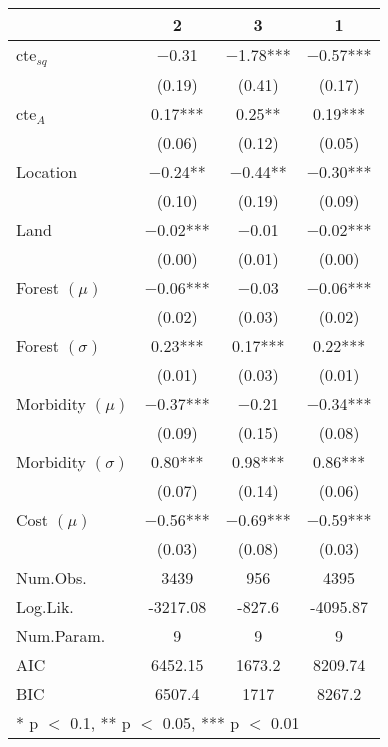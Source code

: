 \begin{table}
\centering
\begin{tabular}[t]{lccc}
\toprule
  & 2 & 3 & 1\\
\midrule
cte$_{sq}$ & \num{-0.31} & \num{-1.78}*** & \num{-0.57}***\\
 & (\num{0.19}) & (\num{0.41}) & (\num{0.17})\\
cte$_{A}$ & \num{0.17}*** & \num{0.25}** & \num{0.19}***\\
 & (\num{0.06}) & (\num{0.12}) & (\num{0.05})\\
Location & \num{-0.24}** & \num{-0.44}** & \num{-0.30}***\\
 & (\num{0.10}) & (\num{0.19}) & (\num{0.09})\\
Land & \num{-0.02}*** & \num{-0.01} & \num{-0.02}***\\
 & (\num{0.00}) & (\num{0.01}) & (\num{0.00})\\
Forest $(\mu)$ & \num{-0.06}*** & \num{-0.03} & \num{-0.06}***\\
 & (\num{0.02}) & (\num{0.03}) & (\num{0.02})\\
Forest $(\sigma)$ & \num{0.23}*** & \num{0.17}*** & \num{0.22}***\\
 & (\num{0.01}) & (\num{0.03}) & (\num{0.01})\\
Morbidity $(\mu)$ & \num{-0.37}*** & \num{-0.21} & \num{-0.34}***\\
 & (\num{0.09}) & (\num{0.15}) & (\num{0.08})\\
Morbidity $(\sigma)$ & \num{0.80}*** & \num{0.98}*** & \num{0.86}***\\
 & (\num{0.07}) & (\num{0.14}) & (\num{0.06})\\
Cost $(\mu)$ & \num{-0.56}*** & \num{-0.69}*** & \num{-0.59}***\\
 & (\num{0.03}) & (\num{0.08}) & (\num{0.03})\\
Num.Obs. & 3439 & 956 & 4395\\
Log.Lik. & -3217.08 & -827.6 & -4095.87\\
Num.Param. & 9 & 9 & 9\\
AIC & 6452.15 & 1673.2 & 8209.74\\
BIC & 6507.4 & 1717 & 8267.2\\
\bottomrule
\multicolumn{4}{l}{\rule{0pt}{1em}* p $<$ 0.1, ** p $<$ 0.05, *** p $<$ 0.01}\\
\end{tabular}
\end{table}
